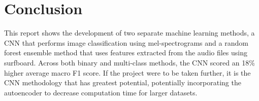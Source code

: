\documentclass[conference]{IEEEtran}
\begin{document}

\section{Conclusion}
\label{Conc}
This report shows the development of two separate machine learning methods, a CNN that performs image classification using mel-spectrograms and a random forest ensemble method that uses features extracted from the audio files using surfboard. Across both binary and multi-class methods, the CNN scored an 18\% higher average macro F1 score. If the project were to be taken further, it is the CNN methodology that has greatest potential, potentially incorporating the autoencoder to decrease computation time for larger datasets.  
\end{document}

